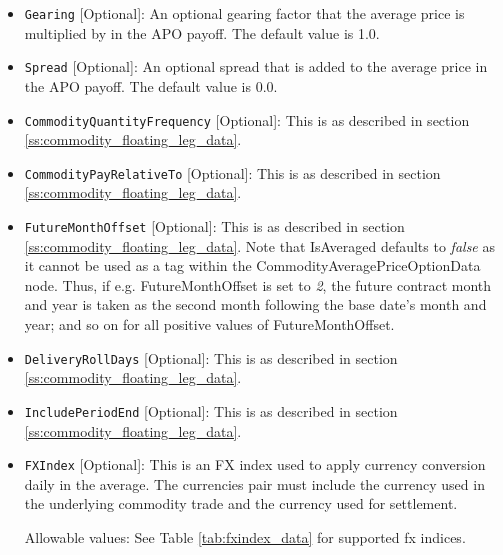 \begin{itemize}
\item \lstinline!Gearing! [Optional]: An optional gearing factor that the average price is multiplied by in the APO payoff. The default value is 1.0.

\item \lstinline!Spread! [Optional]: An optional spread that is added to the average price in the APO payoff. The default value is 0.0.

\item \lstinline!CommodityQuantityFrequency! [Optional]: This is as described in section \ref{ss:commodity_floating_leg_data}.

\item \lstinline!CommodityPayRelativeTo! [Optional]: This is as described in section \ref{ss:commodity_floating_leg_data}.

\item \lstinline!FutureMonthOffset! [Optional]: This is as described in section \ref{ss:commodity_floating_leg_data}. Note that IsAveraged defaults to \emph{false} as it cannot be used as a tag within the CommodityAveragePriceOptionData node. Thus, if e.g. FutureMonthOffset is set to \emph{2}, the future contract month and year is taken as the second month following the base date’s month and year; and so on for all positive values of FutureMonthOffset.

\item \lstinline!DeliveryRollDays! [Optional]: This is as described in section \ref{ss:commodity_floating_leg_data}.

\item \lstinline!IncludePeriodEnd! [Optional]: This is as described in section \ref{ss:commodity_floating_leg_data}.

\item \lstinline!FXIndex! [Optional]: This is an FX index used to apply currency conversion daily in the average. The currencies pair must include the currency used in the underlying commodity trade and the currency used for settlement.

Allowable values:  See Table \ref{tab:fxindex_data} for supported fx indices.

\end{itemize}

